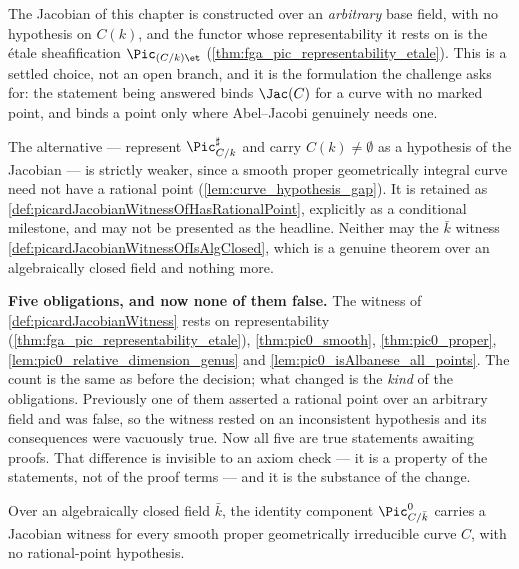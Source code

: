 \begin{remark}
  \label{rem:rational_point_scope}
  The Jacobian of this chapter is constructed over an \emph{arbitrary} base field, with no
  hypothesis on \(C(k)\), and the functor whose representability it rests on is the
  \'etale sheafification \(\Pic_{(C/k)\et}\)
  (\cref{thm:fga_pic_representability_etale}). This is a settled choice, not an open
  branch, and it is the formulation the challenge asks for: the statement being answered
  binds \(\Jac(C)\) for a curve with no marked point, and binds a point only where
  Abel--Jacobi genuinely needs one.

  The alternative --- represent \(\Pic^\sharp_{C/k}\) and carry
  \(C(k) \neq \emptyset\) as a hypothesis of the Jacobian --- is strictly weaker, since a
  smooth proper geometrically integral curve need not have a rational point
  (\cref{lem:curve_hypothesis_gap}). It is retained as
  \cref{def:picardJacobianWitnessOfHasRationalPoint}, explicitly as a conditional
  milestone, and may not be presented as the headline. Neither may the \(\bar k\) witness
  \cref{def:picardJacobianWitnessOfIsAlgClosed}, which is a genuine theorem over an
  algebraically closed field and nothing more.

  \textbf{Five obligations, and now none of them false.} The witness of
  \cref{def:picardJacobianWitness} rests on representability
  (\cref{thm:fga_pic_representability_etale}), \cref{thm:pic0_smooth},
  \cref{thm:pic0_proper}, \cref{lem:pic0_relative_dimension_genus} and
  \cref{lem:pic0_isAlbanese_all_points}. The count is the same as before the decision;
  what changed is the \emph{kind} of the obligations. Previously one of them asserted a
  rational point over an arbitrary field and was false, so the witness rested on an
  inconsistent hypothesis and its consequences were vacuously true. Now all five are true
  statements awaiting proofs. That difference is invisible to an axiom check --- it is a
  property of the statements, not of the proof terms --- and it is the substance of the
  change.
\end{remark}

\begin{theorem}
  \label{def:picardJacobianWitnessOfIsAlgClosed}
  Over an algebraically closed field \(\bar k\), the identity component
  \(\Pic^0_{C/\bar k}\) carries a Jacobian witness for every smooth proper
  geometrically irreducible curve \(C\), with no rational-point hypothesis.
\end{theorem}

